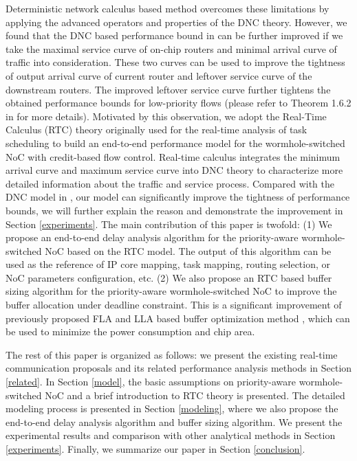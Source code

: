 \documentclass[10pt,journal]{IEEEtran}
\begin{document}
Deterministic network calculus based method \cite{Qian489900} overcomes these limitations by applying the advanced operators and properties of the DNC theory. However, we found that the DNC based performance bound in \cite{Qian489900} can be further improved if we take the maximal service curve of on-chip routers and minimal arrival curve of traffic into consideration. These two curves can be used to improve the tightness of output arrival curve of current router and leftover service curve of the downstream routers. The improved leftover service curve further tightens the obtained performance bounds for low-priority flows (please refer to Theorem 1.6.2 in \cite{Boudec2001Network} for more details). Motivated by this observation, we adopt the Real-Time Calculus (RTC) theory \cite{1253607} originally used for the real-time analysis of task scheduling to build an end-to-end performance model for the wormhole-switched NoC with credit-based flow control. Real-time calculus integrates the minimum arrival curve and maximum service curve into DNC theory to characterize more detailed information about the traffic and service process. Compared with the DNC model in \cite{Qian489900}, our model can significantly improve the tightness of performance bounds, we will further explain the reason and demonstrate the improvement in Section \ref{experiments}. The main contribution of this paper is twofold: (1) We propose an end-to-end delay analysis algorithm for the priority-aware wormhole-switched NoC based on the RTC model. The output of this algorithm can be used as the reference of IP core mapping, task mapping, routing selection, or NoC parameters configuration, etc. (2) We also propose an RTC based buffer sizing algorithm for the priority-aware wormhole-switched NoC to improve the buffer allocation under deadline constraint. This is a significant improvement of previously proposed FLA and LLA based buffer optimization method \cite{189}, which can be used to minimize the power consumption and chip area.

The rest of this paper is organized as follows: we present the existing real-time communication proposals and its related performance analysis methods in Section \ref{related}. In Section \ref{model}, the basic assumptions on priority-aware wormhole-switched NoC and a brief introduction to RTC theory is presented. The detailed modeling process is presented in Section \ref{modeling}, where we also propose the end-to-end delay analysis algorithm and buffer sizing algorithm. We present the experimental results and comparison with other analytical methods in Section \ref{experiments}. Finally, we summarize our paper in Section \ref{conclusion}.
\end{document}
